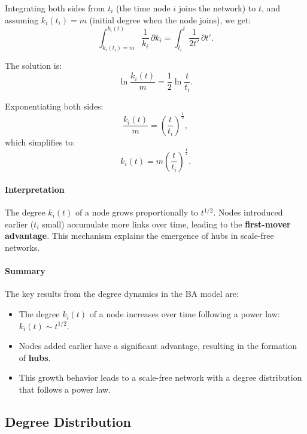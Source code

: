 \documentclass{article}
\begin{document}
Integrating both sides from \( t_i \) (the time node \( i \) joins the network) to \( t \), and assuming \( k_i(t_i) = m \) (initial degree when the node joins), we get:
\begin{equation}
\int_{k_i(t_i)=m}^{k_i(t)} \frac{1}{k_i} \, \partial k_i = \int_{t_i}^{t} \frac{1}{2t'} \, \partial t'.
\end{equation}

The solution is:
\begin{equation}
\ln \frac{k_i(t)}{m} = \frac{1}{2} \ln \frac{t}{t_i}.
\end{equation}

Exponentiating both sides:
\begin{equation}
\frac{k_i(t)}{m} = \left( \frac{t}{t_i} \right)^{\frac{1}{2}},
\end{equation}
which simplifies to:
\begin{equation}
k_i(t) = m \left( \frac{t}{t_i} \right)^{\frac{1}{2}}.
\end{equation}

\paragraph{Interpretation}
The degree \( k_i(t) \) of a node grows proportionally to \( t^{1/2} \). Nodes introduced earlier (\( t_i \) small) accumulate more links over time, leading to the \textbf{first-mover advantage}. This mechanism explains the emergence of hubs in scale-free networks.

\paragraph{Summary}
The key results from the degree dynamics in the BA model are:
\begin{itemize}
    \item The degree \( k_i(t) \) of a node increases over time following a power law: \( k_i(t) \sim t^{1/2} \).
    \item Nodes added earlier have a significant advantage, resulting in the formation of \textbf{hubs}.
    \item This growth behavior leads to a scale-free network with a degree distribution that follows a power law.
\end{itemize}
\subsection{Degree Distribution}
\end{document}
